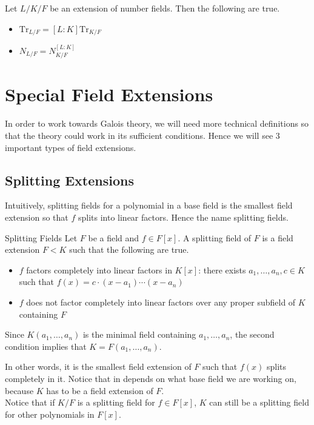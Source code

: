 \documentclass[a4paper]{article}
\begin{document}
\begin{crl}{}{} Let $L/K/F$ be an extension of number fields. Then the following are true. 
\begin{itemize}
\item $\text{Tr}_{L/F}=[L:K]\text{Tr}_{K/F}$
\item $N_{L/F}=N_{K/F}^{[L:K]}$
\end{itemize}
\end{crl}

\pagebreak
\section{Special Field Extensions}
In order to work towards Galois theory, we will need more technical definitions so that the theory could work in its sufficient conditions. Hence we will see $3$ important types of field extensions. 

\subsection{Splitting Extensions}
Intuitively, splitting fields for a polynomial in a base field is the smallest field extension so that $f$ splits into linear factors. Hence the name splitting fields. 

\begin{defn}{Splitting Fields}{} Let $F$ be a field and $f\in F[x]$. A splitting field of $F$ is a field extension $F<K$ such that the following are true. 
\begin{itemize}
\item $f$ factors completely into linear factors in $K[x]$: there exists $a_1,\dots,a_n,c\in K$ such that $f(x)=c\cdot (x-a_1)\cdots(x-a_n)$
\item $f$ does not factor completely into linear factors over any proper subfield of $K$ containing $F$
\end{itemize}
Since $K(a_1,\dots,a_n)$ is the minimal field containing $a_1,\dots,a_n$, the second condition implies that $K=F(a_1,\dots,a_n)$. 
\end{defn}

In other words, it is the smallest field extension of $F$ such that $f(x)$ splits completely in it. Notice that in depends on what base field we are working on, because $K$ has to be a field extension of $F$. \\

Notice that if $K/F$ is a splitting field for $f\in F[x]$, $K$ can still be a splitting field for other polynomials in $F[x]$. 
\end{document}
